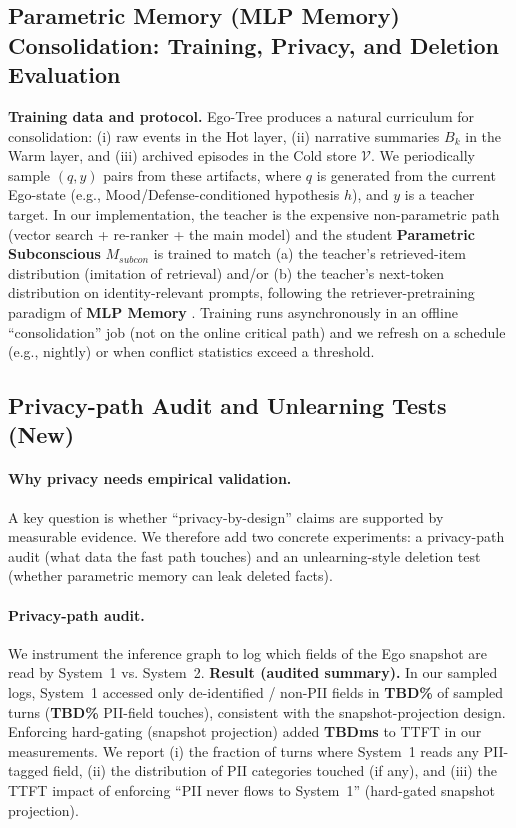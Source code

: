 \documentclass{article}
\begin{document}
\subsection{Parametric Memory (MLP Memory) Consolidation: Training, Privacy, and Deletion Evaluation}
\label{app:subcon-training}
\textbf{Training data and protocol.}
Ego-Tree produces a natural curriculum for consolidation: (i) raw events in the Hot layer, (ii) narrative summaries $B_k$ in the Warm layer, and (iii) archived episodes in the Cold store $\mathcal{V}$.
We periodically sample $(q, y)$ pairs from these artifacts, where $q$ is generated from the current Ego-state (e.g., Mood/Defense-conditioned hypothesis $h$), and $y$ is a teacher target.
In our implementation, the teacher is the expensive non-parametric path (vector search + re-ranker + the main model) and the student \textbf{Parametric Subconscious} $M_{subcon}$ is trained to match (a) the teacher's retrieved-item distribution (imitation of retrieval) and/or (b) the teacher's next-token distribution on identity-relevant prompts, following the retriever-pretraining paradigm of \textbf{MLP Memory} \cite{wei2025mlpmemory}.
Training runs asynchronously in an offline ``consolidation'' job (not on the online critical path) and we refresh on a schedule (e.g., nightly) or when conflict statistics exceed a threshold.

\subsection{Privacy-path Audit and Unlearning Tests (New)}
\label{app:privacy-unlearning}
\paragraph{Why privacy needs empirical validation.}
A key question is whether ``privacy-by-design'' claims are supported by measurable evidence.
We therefore add two concrete experiments: a privacy-path audit (what data the fast path touches) and an unlearning-style deletion test (whether parametric memory can leak deleted facts).

\paragraph{Privacy-path audit.}
We instrument the inference graph to log which fields of the Ego snapshot are read by System~1 vs. System~2.
\textbf{Result (audited summary).} In our sampled logs, System~1 accessed only de-identified / non-PII fields in \textbf{TBD\%} of sampled turns (\textbf{TBD\%} PII-field touches), consistent with the snapshot-projection design. Enforcing hard-gating (snapshot projection) added \textbf{TBDms} to TTFT in our measurements.
We report (i) the fraction of turns where System~1 reads any PII-tagged field, (ii) the distribution of PII categories touched (if any), and (iii) the TTFT impact of enforcing ``PII never flows to System~1'' (hard-gated snapshot projection).
\end{document}
